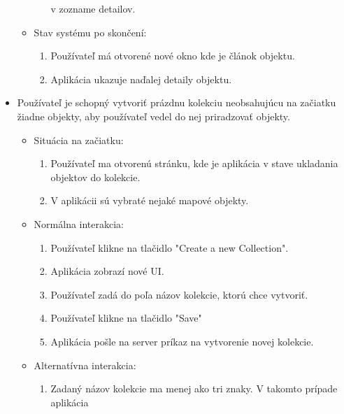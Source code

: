 \begin{itemize}
\begin{itemize}
\begin{enumerate}
                                    v zozname detailov.
                        \end{enumerate}
                  \item Stav systému po skončení:
                        \begin{enumerate}
                              \item Používateľ má otvorené nové okno kde je článok objektu.
                              \item Aplikácia ukazuje naďalej detaily objektu.
                        \end{enumerate}
            \end{itemize}

      \item Používateľ je schopný vytvoriť prázdnu kolekciu neobsahujúcu na začiatku žiadne objekty, aby používateľ vedel do nej priradzovať objekty.
            \begin{itemize}
                  \item Situácia na začiatku:
                        \begin{enumerate}
                              \item Používateľ ma otvorenú stránku, kde je aplikácia v stave ukladania objektov do kolekcie.
                              \item V aplikácii sú vybraté nejaké mapové objekty.
                        \end{enumerate}
                  \item Normálna interakcia:
                        \begin{enumerate}
                              \item Používateľ klikne na tlačidlo "Create a new Collection".
                              \item Aplikácia zobrazí nové UI.
                              \item Používateľ zadá do poľa názov kolekcie, ktorú chce vytvoriť.
                              \item Používateľ klikne na tlačidlo "Save"
                              \item Aplikácia pošle na server príkaz na vytvorenie novej kolekcie.
                        \end{enumerate}
                  \item Alternatívna interakcia:
                        \begin{enumerate}
                              \item Zadaný názov kolekcie ma menej ako tri znaky. V takomto prípade aplikácia

\end{enumerate}
\end{itemize}
\end{itemize}
